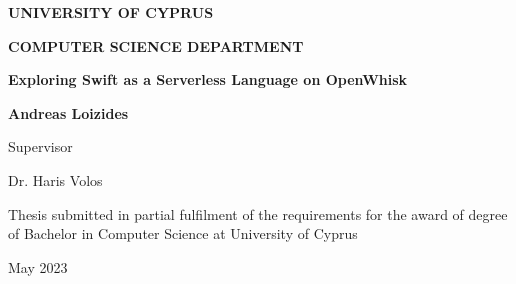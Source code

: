 \documentclass[12pt]{report}
\def\ptitle{Exploring Swift as a Serverless Language on OpenWhisk}
\begin{document}
\begin{titlepage}

\begin{center}
\LARGE{\textbf{\MakeUppercase{University of Cyprus}}}

\Large{\textbf{\MakeUppercase{Computer Science Department}}}

\vspace*{6cm}

\large{\textbf{\ptitle{}}}

\vspace*{0.5cm}

\large{\textbf{Andreas Loizides}}

\vspace*{5cm}

\large{Supervisor}

\large{Dr. Haris Volos}

\vspace*{4cm}

Thesis submitted in partial fulfilment of the requirements for the award of degree of Bachelor in Computer Science at University of Cyprus

\vspace*{1cm}

May 2023
\end{center}

\end{titlepage}



\newpage



\tableofcontents
\listoffigures


%
%

%

%

%
%



%



\balance



\end{document}
